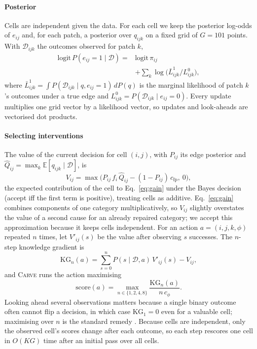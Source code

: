 \documentclass[11pt]{article}
\newcommand{\carve}{\textsc{Carve}}
\begin{document}
\paragraph{Posterior}
Cells are independent given the data. For each cell we keep the posterior log-odds of $e_{ij}$ and, for each patch, a posterior over $q_{ijk}$ on a fixed grid of $G=101$ points. With $\mathcal{D}_{ijk}$ the outcomes observed for patch $k$,
\begin{equation}
\begin{aligned}
\mathrm{logit}\,P(e_{ij}{=}1\mid\mathcal{D}) ={}& \mathrm{logit}\,\pi_{ij}\\
&+ \textstyle\sum_k \log\big(\bar L^{1}_{ijk}/L^{0}_{ijk}\big),
\end{aligned}
\end{equation}
where $\bar L^{1}_{ijk}=\int P(\mathcal{D}_{ijk}\mid q,e_{ij}{=}1)\,dP(q)$ is the marginal likelihood of patch $k$'s outcomes under a true edge and $L^{0}_{ijk}=P(\mathcal{D}_{ijk}\mid e_{ij}{=}0)$.
Every update multiplies one grid vector by a likelihood vector, so updates and look-aheads are vectorised dot products.

\paragraph{Selecting interventions}
The value of the current decision for cell $(i,j)$, with $P_{ij}$ its edge posterior and $\hat Q_{ij}=\max_k\mathbb{E}[q_{ijk}\mid\mathcal{D}]$, is
\begin{equation}
V_{ij} = \max\big(P_{ij}\,f_i\,\hat Q_{ij} - (1-P_{ij})\,c_{\mathrm{fp}},\ 0\big),
\end{equation}
the expected contribution of the cell to Eq.~\ref{eq:gain} under the Bayes decision (accept iff the first term is positive), treating cells as additive. Eq.~\ref{eq:gain} combines components of one category multiplicatively, so $V_{ij}$ slightly overstates the value of a second cause for an already repaired category; we accept this approximation because it keeps cells independent. For an action $a=(i,j,k,\phi)$ repeated $n$ times, let $V'_{ij}(s)$ be the value after observing $s$ successes. The $n$-step knowledge gradient is
\begin{equation}
\mathrm{KG}_n(a) = \sum_{s=0}^{n} P(s\mid\mathcal{D},a)\,V'_{ij}(s) - V_{ij},
\end{equation}
and \carve{} runs the action maximising
\begin{equation}
\mathrm{score}(a) = \max_{n\in\{1,2,4,8\}} \frac{\mathrm{KG}_n(a)}{n\,c_\phi}.
\label{eq:score}
\end{equation}
Looking ahead several observations matters because a single binary outcome often cannot flip a decision, in which case $\mathrm{KG}_1=0$ even for a valuable cell; maximising over $n$ is the standard remedy \citep{frazier2008kg}. Because cells are independent, only the observed cell's scores change after each outcome, so each step rescores one cell in $O(KG)$ time after an initial pass over all cells.
\end{document}
